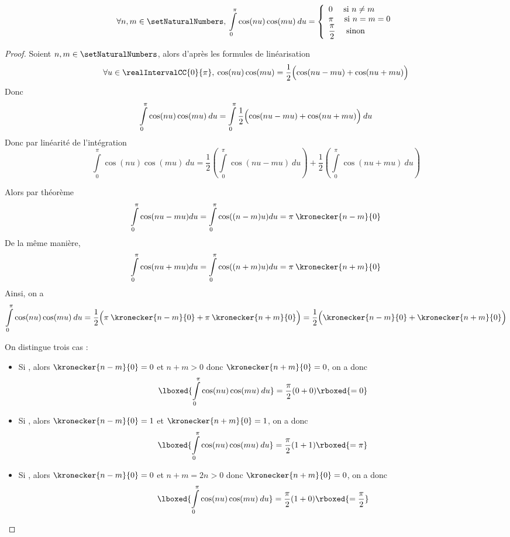 \begin{lemma}
\[
\forall n, m \in \setNaturalNumbers, \: \displaystyle\int\limits_{0}^{\pi} \cos(nu)\cos(mu) \:du = \left\{\begin{array}{l}
0 \quad\text{ si } n \ne m\\
\pi \quad\text{ si } n = m = 0\\
\dfrac{\pi}{2} \quad\text{ sinon}
\end{array}\right. 
\]
\end{lemma}

\begin{proof}
Soient $n, m \in \setNaturalNumbers$, alors d'après les formules de linéarisation
\[
\forall u \in \realIntervalCC{0}{\pi}, \: \cos(nu)\cos(mu) = \dfrac{1}{2}\Bigl(\cos(nu-mu)+\cos(nu+mu)\Bigr) 
\]
Donc 
\[
\displaystyle\int\limits_{0}^{\pi} \cos(nu)\cos(mu) \:du 
= \displaystyle\int\limits_{0}^{\pi} \dfrac{1}{2}\Bigl(\cos(nu-mu)+\cos(nu+mu)\Bigr)  \:du 
\]
Donc par linéarité de l'intégration
\[
\displaystyle\int\limits_{0}^{\pi} \cos(nu)\cos(mu) \:du 
=\dfrac{1}{2}\left(\displaystyle\int\limits_{0}^{\pi} \cos(nu-mu)\:du\right)+\dfrac{1}{2}\left(\displaystyle\int\limits_{0}^{\pi} \cos(nu+mu)\:du \right)
\]

Alors par théorème
\[
\displaystyle\int\limits_{0}^{\pi} \cos(nu-mu) du 
= \displaystyle\int\limits_{0}^{\pi} \cos((n-m)u) du 
= \pi\: \kronecker{n - m}{0}
\]
De la même manière, 
\[
\displaystyle\int\limits_{0}^{\pi} \cos(nu+mu) du 
= \displaystyle\int\limits_{0}^{\pi} \cos((n+m)u) du 
= \pi\: \kronecker{n + m}{0}
\]
Ainsi, on a 
\[
\displaystyle\int\limits_{0}^{\pi} \cos(nu)\cos(mu) \:du 
=\dfrac{1}{2}\Bigl(\pi\: \kronecker{n - m}{0} + \pi\: \kronecker{n + m}{0}\Bigr)
=\dfrac{1}{2}\Bigl(\kronecker{n - m}{0} + \kronecker{n + m}{0}\Bigr)
\]

On distingue trois cas :
\begin{itemize}
\item Si , alors $\kronecker{n - m}{0} = 0$ et $n + m > 0$ donc $\kronecker{n + m}{0} = 0$, on a donc 
\[
\lboxed{\displaystyle\int\limits_{0}^{\pi} \cos(nu)\cos(mu) \:du }
=\dfrac{\pi}{2}(0 + 0) \rboxed{= 0} 
\]
\item Si , alors $\kronecker{n - m}{0} = 1$ et $\kronecker{n + m}{0} = 1$, on a donc 
\[
\lboxed{\displaystyle\int\limits_{0}^{\pi} \cos(nu)\cos(mu) \:du} 
=\dfrac{\pi}{2}(1 + 1) \rboxed{= \pi} 
\]
\item Si , alors $\kronecker{n - m}{0} = 0$ et $n + m = 2n > 0$ donc $\kronecker{n + m}{0} = 0$, on a donc 
\[
\lboxed{\displaystyle\int\limits_{0}^{\pi} \cos(nu)\cos(mu) \:du} 
=\dfrac{\pi}{2}(1 + 0) \rboxed{= \dfrac{\pi}{2}}
\]
\end{itemize}
\end{proof}